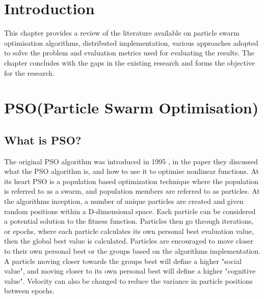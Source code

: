 \documentclass[oneside,12pt]{book}
\begin{document}
\section{Introduction}
This  chapter  provides  a  review of the  literature available on particle swarm optimisation algorithms, distributed implementation, various  approaches adopted  to  solve  the  problem  and  evaluation metrics used  for  evaluating  the results.  The  chapter  concludes with  the  gaps  in  the existing research and forms the objective for the research.
\section{PSO(Particle Swarm Optimisation)}
\subsection{What is PSO?}
The original PSO algorithm was introduced in 1995 \cite{kennedy1995particle}, in the paper they discussed what the PSO algorithm is, and how to use it to optimise nonlinear functions. At its heart PSO is a population based optimization technique where the population is referred to as a swarm, and population members are referred to as particles. At the algorithms inception, a number of unique particles are created and given random positions within a D-dimensional space. Each particle can be considered a potential solution to the fitness function. Particles then go through iterations, or epochs, where each particle calculates its own personal best evaluation value, then the global best value is calculated. Particles are encouraged to move closer to their own personal best or the groups based on the algorithms implementation. A particle moving closer towards the groups best will define a higher "social value", and moving closer to its own personal best will define a higher "cognitive value". Velocity can also be changed to reduce the variance in particle positions between epochs.
\end{document}
